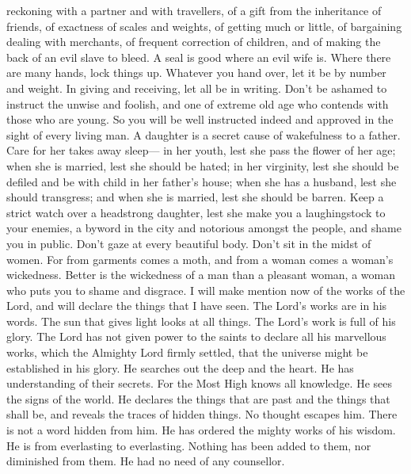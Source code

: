 reckoning with a partner and with travellers, of a gift from the
inheritance of friends,  of exactness of scales and weights,
of getting much or little,  of bargaining dealing with
merchants, of frequent correction of children, and of making the back of
an evil slave to bleed.  A seal is good where an evil wife
is. Where there are many hands, lock things up.  Whatever
you hand over, let it be by number and weight. In giving and receiving,
let all be in writing.  Don't be ashamed to instruct the
unwise and foolish, and one of extreme old age who contends with those
who are young. So you will be well instructed indeed and approved in the
sight of every living man.  A daughter is a secret cause of
wakefulness to a father. Care for her takes away sleep--- in her youth,
lest she pass the flower of her age; when she is married, lest she
should be hated;  in her virginity, lest she should be
defiled and be with child in her father's house; when she has a husband,
lest she should transgress; and when she is married, lest she should be
barren.  Keep a strict watch over a headstrong daughter,
lest she make you a laughingstock to your enemies, a byword in the city
and notorious amongst the people, and shame you in public. 
Don't gaze at every beautiful body. Don't sit in the midst of women.
 For from garments comes a moth, and from a woman comes a
woman's wickedness.  Better is the wickedness of a man than
a pleasant woman, a woman who puts you to shame and disgrace.
 I will make mention now of the works of the Lord, and will
declare the things that I have seen. The Lord's works are in his words.
 The sun that gives light looks at all things. The Lord's
work is full of his glory.  The Lord has not given power to
the saints to declare all his marvellous works, which the Almighty Lord
firmly settled, that the universe might be established in his glory.
 He searches out the deep and the heart. He has
understanding of their secrets. For the Most High knows all knowledge.
He sees the signs of the world.  He declares the things
that are past and the things that shall be, and reveals the traces of
hidden things.  No thought escapes him. There is not a word
hidden from him.  He has ordered the mighty works of his
wisdom. He is from everlasting to everlasting. Nothing has been added to
them, nor diminished from them. He had no need of any counsellor.
